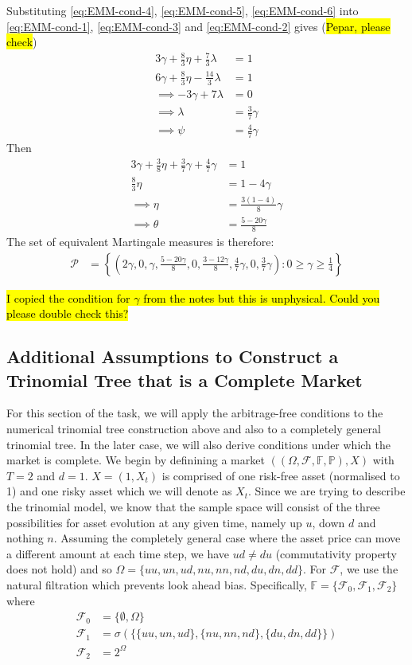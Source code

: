 \documentclass{article}
\begin{document}
Substituting \ref{eq:EMM-cond-4}, \ref{eq:EMM-cond-5}, \ref{eq:EMM-cond-6} into \ref{eq:EMM-cond-1}, \ref{eq:EMM-cond-3} and \ref{eq:EMM-cond-2} gives (\hl{Pepar, please check})
\begin{align*}
    3\gamma + \frac{8}{3}\eta + \frac{7}{3}\lambda & = 1 \\
    6\gamma + \frac{8}{3}\eta - \frac{14}{3}\lambda & = 1 \\
    \implies -3\gamma + 7\lambda & = 0 \\
    \implies \lambda & = \frac{3}{7}\gamma \\
    \implies \psi & = \frac{4}{7}\gamma
\end{align*}
Then
\begin{align*}
    3\gamma+\frac{3}{8}\eta + \frac{3}{7}\gamma + \frac{4}{7}\gamma & = 1 \\
    \frac{8}{3}\eta & = 1 - 4\gamma \\
    \implies \eta & = \frac{3(1-4)}{8}\gamma \\
    \implies \theta & = \frac{5-20\gamma}{8}
\end{align*}
The set of equivalent Martingale measures is therefore:
\begin{align*}
    \mathcal{P} & =\left\{ \left(2\gamma,0,\gamma,\frac{5-20\gamma}{8},0,\frac{3-12\gamma}{8},\frac{4}{7}\gamma,0,\frac{3}{7}\gamma\right): 0\ge\gamma\ge\frac{1}{4}\right\}
\end{align*}

\hl{I copied the condition for $\gamma$ from the notes but this is unphysical. Could you please double check this? }

\subsection{Additional Assumptions to Construct a Trinomial Tree that is a Complete Market}
For this section of the task, we will apply the arbitrage-free conditions to the numerical trinomial tree construction above and also to a completely general trinomial tree. In the later case, we will also derive conditions under which the market is complete. We begin by definining a market $((\Omega, \mathcal{F},\mathbb{F},\mathbb{P}),X)$ with $T=2$ and $d=1$. $X = (1,X_t)$ is comprised of one risk-free asset (normalised to 1) and one risky asset which we will denote as $X_t$. Since we are trying to describe the trinomial model, we know that the sample space will consist of the three possibilities for asset evolution at any given time, namely up $u$, down $d$ and nothing $n$. Assuming the completely general case where the asset price can move a different amount at each time step, we have $ud\neq du$ (commutativity property does not hold) and so $\Omega = \{uu,un,ud,nu,nn,nd,du,dn,dd\}$. For $\mathcal{F}$, we use the natural filtration which prevents look ahead bias. Specifically, $\mathbb{F} = \{\mathcal{F}_0, \mathcal{F}_1, \mathcal{F}_2\}$ where
\begin{align*}
    \mathcal{F}_0 &= \{\emptyset,\Omega\} \\
    \mathcal{F}_1 &= \sigma(\{\{uu,un,ud\},\{nu,nn,nd\},\{du,dn,dd\}\}) \\
    \mathcal{F}_2 &= 2^\Omega
\end{align*}
\end{document}
